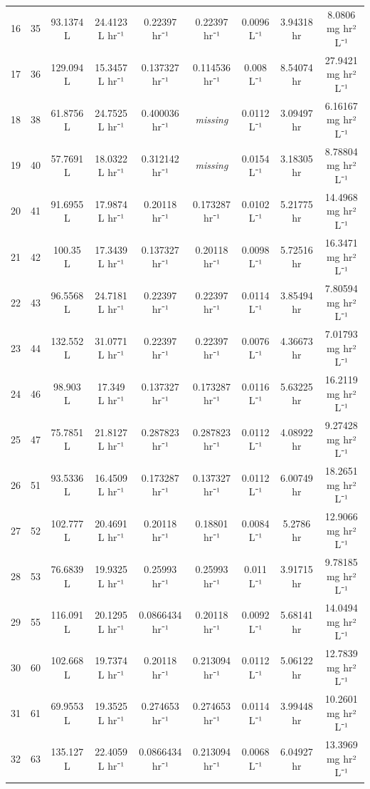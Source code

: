 \documentclass[12pt,a4paper]{article}
\begin{document}
\begin{tabular}{r|cccccccc}
	16 & 35 & 93.1374 L & 24.4123 L hr⁻¹ & 0.22397 hr⁻¹ & 0.22397 hr⁻¹ & 0.0096 L⁻¹ & 3.94318 hr & 8.0806 mg hr² L⁻¹ \\
	17 & 36 & 129.094 L & 15.3457 L hr⁻¹ & 0.137327 hr⁻¹ & 0.114536 hr⁻¹ & 0.008 L⁻¹ & 8.54074 hr & 27.9421 mg hr² L⁻¹ \\
	18 & 38 & 61.8756 L & 24.7525 L hr⁻¹ & 0.400036 hr⁻¹ & \emph{missing} & 0.0112 L⁻¹ & 3.09497 hr & 6.16167 mg hr² L⁻¹ \\
	19 & 40 & 57.7691 L & 18.0322 L hr⁻¹ & 0.312142 hr⁻¹ & \emph{missing} & 0.0154 L⁻¹ & 3.18305 hr & 8.78804 mg hr² L⁻¹ \\
	20 & 41 & 91.6955 L & 17.9874 L hr⁻¹ & 0.20118 hr⁻¹ & 0.173287 hr⁻¹ & 0.0102 L⁻¹ & 5.21775 hr & 14.4968 mg hr² L⁻¹ \\
	21 & 42 & 100.35 L & 17.3439 L hr⁻¹ & 0.137327 hr⁻¹ & 0.20118 hr⁻¹ & 0.0098 L⁻¹ & 5.72516 hr & 16.3471 mg hr² L⁻¹ \\
	22 & 43 & 96.5568 L & 24.7181 L hr⁻¹ & 0.22397 hr⁻¹ & 0.22397 hr⁻¹ & 0.0114 L⁻¹ & 3.85494 hr & 7.80594 mg hr² L⁻¹ \\
	23 & 44 & 132.552 L & 31.0771 L hr⁻¹ & 0.22397 hr⁻¹ & 0.22397 hr⁻¹ & 0.0076 L⁻¹ & 4.36673 hr & 7.01793 mg hr² L⁻¹ \\
	24 & 46 & 98.903 L & 17.349 L hr⁻¹ & 0.137327 hr⁻¹ & 0.173287 hr⁻¹ & 0.0116 L⁻¹ & 5.63225 hr & 16.2119 mg hr² L⁻¹ \\
	25 & 47 & 75.7851 L & 21.8127 L hr⁻¹ & 0.287823 hr⁻¹ & 0.287823 hr⁻¹ & 0.0112 L⁻¹ & 4.08922 hr & 9.27428 mg hr² L⁻¹ \\
	26 & 51 & 93.5336 L & 16.4509 L hr⁻¹ & 0.173287 hr⁻¹ & 0.137327 hr⁻¹ & 0.0112 L⁻¹ & 6.00749 hr & 18.2651 mg hr² L⁻¹ \\
	27 & 52 & 102.777 L & 20.4691 L hr⁻¹ & 0.20118 hr⁻¹ & 0.18801 hr⁻¹ & 0.0084 L⁻¹ & 5.2786 hr & 12.9066 mg hr² L⁻¹ \\
	28 & 53 & 76.6839 L & 19.9325 L hr⁻¹ & 0.25993 hr⁻¹ & 0.25993 hr⁻¹ & 0.011 L⁻¹ & 3.91715 hr & 9.78185 mg hr² L⁻¹ \\
	29 & 55 & 116.091 L & 20.1295 L hr⁻¹ & 0.0866434 hr⁻¹ & 0.20118 hr⁻¹ & 0.0092 L⁻¹ & 5.68141 hr & 14.0494 mg hr² L⁻¹ \\
	30 & 60 & 102.668 L & 19.7374 L hr⁻¹ & 0.20118 hr⁻¹ & 0.213094 hr⁻¹ & 0.0112 L⁻¹ & 5.06122 hr & 12.7839 mg hr² L⁻¹ \\
	31 & 61 & 69.9553 L & 19.3525 L hr⁻¹ & 0.274653 hr⁻¹ & 0.274653 hr⁻¹ & 0.0114 L⁻¹ & 3.99448 hr & 10.2601 mg hr² L⁻¹ \\
	32 & 63 & 135.127 L & 22.4059 L hr⁻¹ & 0.0866434 hr⁻¹ & 0.213094 hr⁻¹ & 0.0068 L⁻¹ & 6.04927 hr & 13.3969 mg hr² L⁻¹ \\

\end{tabular}
\end{document}
